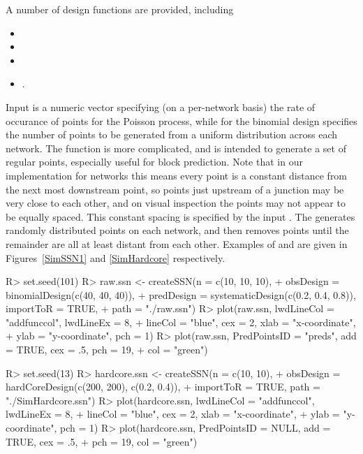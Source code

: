 \documentclass[nojss]{jss}
\renewenvironment{Schunk}{\vspace{\topsep}}{\vspace{\topsep}}
\begin{document}
A number of design functions are provided, including
\begin{itemize}
\item {}
\item {}
\item {}
\item {}.
\end{itemize}
Input  is a numeric vector specifying (on a per-network
basis) the rate of occurance of points for the Poisson process, while
for the binomial design  specifies the number of points to be
generated from a uniform distribution across each network. The
 function is more complicated, and is intended
to generate a set of regular points, especially useful for block
prediction.  Note that in our implementation for networks this means
every point is a constant distance from the next most downstream
point, so points just upstream of a junction may be very close to each
other, and on visual inspection the points may not appear to be
equally spaced.  This constant spacing is specified by the input
.  The  generates
 randomly distributed points on each network, and then removes
points until the remainder are all at least 
distant from each other.  Examples of  and
 are given in Figures~\ref{SimSSN1} and
\ref{SimHardcore} respectively.

\begin{Schunk}
\begin{Sinput}
R> set.seed(101)
R> raw.ssn <- createSSN(n = c(10, 10, 10),
+     obsDesign = binomialDesign(c(40, 40, 40)),
+     predDesign = systematicDesign(c(0.2, 0.4, 0.8)), importToR = TRUE,
+     path = "./raw.ssn")
R> plot(raw.ssn, lwdLineCol = "addfunccol", lwdLineEx = 8,
+     lineCol = "blue", cex = 2, xlab = "x-coordinate",
+     ylab = "y-coordinate", pch = 1)
R> plot(raw.ssn, PredPointsID = "preds", add = TRUE, cex = .5, pch = 19,
+     col = "green")
\end{Sinput}
\end{Schunk}

\begin{Schunk}
\begin{Sinput}
R> set.seed(13)
R> hardcore.ssn <- createSSN(n = c(10, 10),
+     obsDesign = hardCoreDesign(c(200, 200), c(0.2, 0.4)),
+     importToR = TRUE, path = "./SimHardcore.ssn")
R> plot(hardcore.ssn, lwdLineCol = "addfunccol", lwdLineEx = 8,
+     lineCol = "blue", cex = 2, xlab = "x-coordinate",
+     ylab = "y-coordinate", pch = 1)
R> plot(hardcore.ssn, PredPointsID = NULL, add = TRUE, cex = .5,
+     pch = 19, col = "green")
\end{Sinput}
\end{Schunk}
\end{document}
